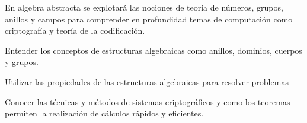 \begin{syllabus}


\begin{justification}
En algebra abstracta se explotará las nociones de teoria de números, grupos, anillos y campos para comprender en profundidad temas de computación como criptografía y teoría de la codificación.
\end{justification}

\begin{goals}
	\item Entender los conceptos de estructuras algebraicas como anillos, dominios, cuerpos y grupos.
	\item Utilizar las propiedades de las estructuras algebraicas para resolver problemas  
	\item  Conocer las técnicas y métodos de sistemas criptográficos y como los teoremas permiten la realización de cálculos rápidos y eficientes.
\end{goals}
\begin{outcomes}
    \item {}
    \item {}
    \item {}
 \end{outcomes}

\begin{competences}
    \item {}
    \item {}
    \item {}
    \item {}
\end{competences}


\end{syllabus}
